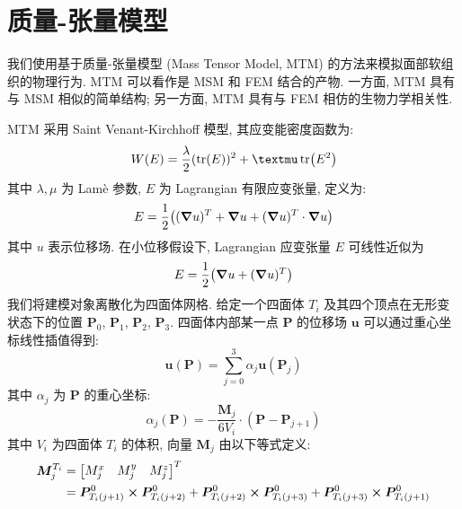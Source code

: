 
\chapter{质量-张量模型}

我们使用基于质量-张量模型 (Mass Tensor Model, MTM) \cite{cotinHybridElasticModel2000} 的方法来模拟面部软组织的物理行为.
MTM 可以看作是 MSM 和 FEM 结合的产物.
一方面, MTM 具有与 MSM 相似的简单结构; 另一方面, MTM 具有与 FEM 相仿的生物力学相关性.

MTM 采用 Saint Venant-Kirchhoff 模型, 其应变能密度函数为:
\begin{equation}
  W(E) = \frac{\lambda}{2} (\tr(E))^2 + \mu \tr(E^2)
\end{equation}
其中 $\lambda, \mu$ 为 Lam\`e 参数, $E$ 为 Lagrangian 有限应变张量, 定义为:
\begin{equation}
  E = \frac{1}{2} \pqty{(\grad{u})^T + \grad{u} + (\grad{u})^T \cdot \grad{u}}
\end{equation}
其中 $u$ 表示位移场.
在小位移假设下, Lagrangian 应变张量 $E$ 可线性近似为
\begin{equation}
  E = \frac{1}{2} \pqty{\grad{u} + (\grad{u})^T}
\end{equation}
我们将建模对象离散化为四面体网格.
给定一个四面体 $T_i$ 及其四个顶点在无形变状态下的位置 $\bm{P}_0$, $\bm{P}_1$, $\bm{P}_2$, $\bm{P}_3$.
四面体内部某一点 $\bm{P}$ 的位移场 $\bm{u}$ 可以通过重心坐标线性插值得到:
\begin{equation}
  \bm{u}(\bm{P}) = \sum_{j = 0}^3 \alpha_j \bm{u}(\bm{P}_j)
\end{equation}
其中 $\alpha_j$ 为 $\bm{P}$ 的重心坐标:
\begin{equation}
  \alpha_j(\bm{P}) = - \frac{\bm{M}_j}{6 V_i} \cdot (\bm{P} - \bm{P}_{j + 1})
\end{equation}
其中 $V_i$ 为四面体 $T_i$ 的体积, 向量 $\bm{M}_j$ 由以下等式定义:
\begin{equation}
  \begin{split}
    \bm{M}_j^{T_i} & =
    \begin{bmatrix}
      M_j^x & M_j^y & M_j^z
    \end{bmatrix}
    ^T                                                                                                                                                                     \\
                   & = \bm{P}_{T_i(j + 1)}^0 \cp \bm{P}_{T_i(j + 2)}^0 + \bm{P}_{T_i(j + 2)}^0 \cp \bm{P}_{T_i(j + 3)}^0 + \bm{P}_{T_i(j + 3)}^0 \cp \bm{P}_{T_i(j + 1)}^0
  \end{split}
\end{equation}
